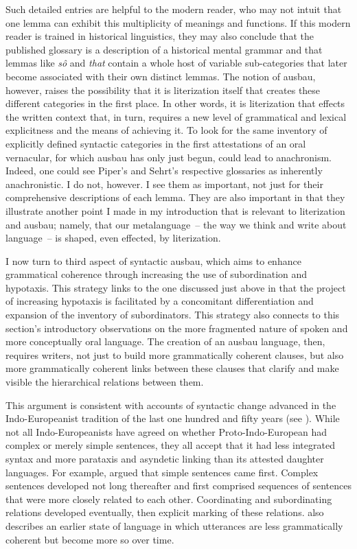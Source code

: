 Such detailed entries are helpful to the modern reader, who may not intuit that one lemma can exhibit this multiplicity of meanings and functions. If this modern reader is trained in historical linguistics, they may also conclude that the published glossary is a description of a historical mental grammar and that lemmas like \textit{sô} and \textit{that} contain a whole host of variable sub-categories that later become associated with their own distinct lemmas.  The notion of ausbau, however, raises the possibility that it is literization itself that creates these different categories in the first place. In other words, it is literization that effects the written context that, in turn, requires a new level of grammatical and lexical explicitness and the means of achieving it. To look for the same inventory of explicitly defined syntactic categories in the first attestations of an oral vernacular, for which ausbau has only just begun, could lead to anachronism. Indeed, one could see Piper's and Sehrt’s respective glossaries as inherently anachronistic. I do not, however. I see them as important, not just for their comprehensive descriptions of each lemma. They are also important in that they illustrate another point I made in my introduction that is relevant to literization and ausbau; namely, that our metalanguage~-- the way we think and write about language~-- is shaped, even effected, by literization.

I now turn to  third aspect of syntactic ausbau, which aims to enhance grammatical coherence through increasing the use of subordination and hypotaxis. This strategy links to the one discussed just above in that the project of increasing hypotaxis is facilitated by a concomitant differentiation and expansion of the inventory of subordinators. This strategy also connects to this section’s introductory observations on the more fragmented nature of spoken and more conceptually oral language. The creation of an ausbau language, then, requires writers, not just to build more grammatically coherent clauses, but also more grammatically coherent links between these clauses that clarify and make visible the hierarchical relations between them.

This argument is consistent with accounts of syntactic change advanced in the Indo-Europeanist tradition of the last one hundred and fifty years (see \citealt[25--27]{HarrisCampbell1995}). While not all Indo-Europeanists have agreed on whether Proto-Indo-European had complex or merely simple sentences, they all accept that it had less integrated syntax and more parataxis and asyndetic linking than its attested daughter languages. For example, \citet[8]{Brugmann1925} argued that simple sentences came first. Complex sentences developed not long thereafter and first comprised sequences of sentences that were more closely related to each other. Coordinating and subordinating relations developed eventually, then explicit marking of these relations. \citet[59--60]{Sweet1900} also describes an earlier state of language in which utterances are less grammatically coherent but become more so over time.

